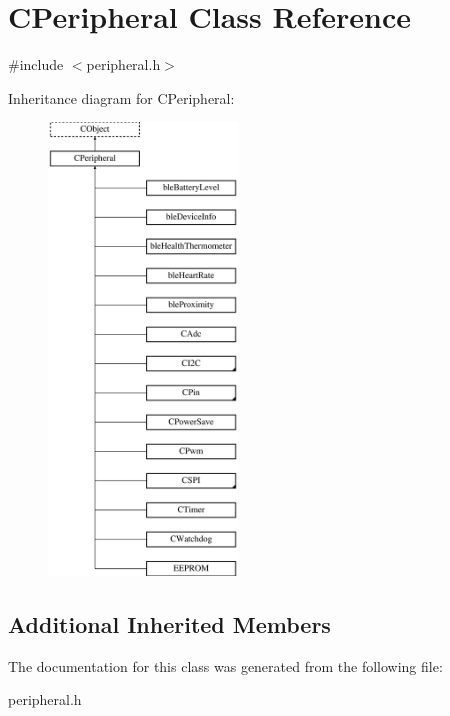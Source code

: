 \hypertarget{class_c_peripheral}{\section{C\-Peripheral Class Reference}
\label{class_c_peripheral}
}


{\ttfamily \#include $<$peripheral.\-h$>$}

Inheritance diagram for C\-Peripheral\-:\begin{figure}[H]
\begin{center}
\leavevmode
\includegraphics[height=12.000000cm]{d9/db6/class_c_peripheral}
\end{center}
\end{figure}
\subsection*{Additional Inherited Members}


The documentation for this class was generated from the following file\-:\begin{DoxyCompactItemize}
\item 
peripheral.\-h\end{DoxyCompactItemize}
